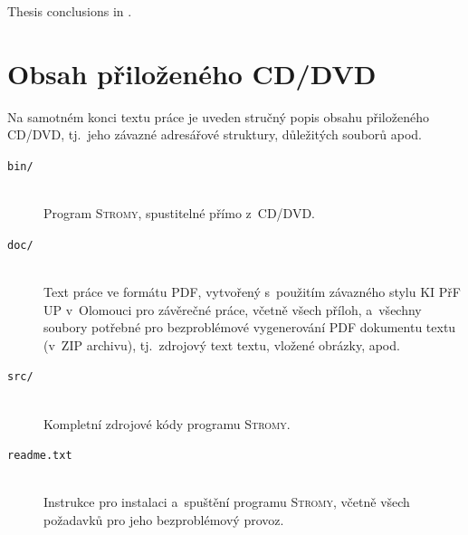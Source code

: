 \documentclass[
  biblatex=false,
  font=serif,
  glossaries=false,
  tables=false,
  theorems=false,
  index
]{kidiplom}
\begin{document}
\begin{kiconclusions}[english]
Thesis conclusions in .
\end{kiconclusions}

\appendix



\section{Obsah přiloženého CD/DVD} \label{sec:ObsahCD}

Na samotném konci textu práce je uveden stručný popis obsahu
přiloženého CD/DVD, tj.~jeho závazné adresářové struktury, důležitých
souborů apod.

\begin{description}

\item[\texttt{bin/}] \hfill \\
  Program \textsc{Stromy}, spustitelné přímo z~CD/DVD. 

\item[\texttt{doc/}] \hfill \\
  Text práce ve formátu PDF, vytvořený s~použitím závazného stylu KI
  PřF UP v~Olomouci pro závěrečné práce, včetně všech příloh,
  a~všechny soubory potřebné pro bezproblémové vygenerování PDF
  dokumentu textu (v~ZIP archivu), tj.~zdrojový text textu, vložené
  obrázky, apod.

\item[\texttt{src/}] \hfill \\
  Kompletní zdrojové kódy programu \textsc{Stromy}.

\item[\texttt{readme.txt}] \hfill \\
  Instrukce pro instalaci a~spuštění programu \textsc{Stromy}, včetně
  všech požadavků pro jeho bezproblémový provoz.

\end{description}
\end{document}
